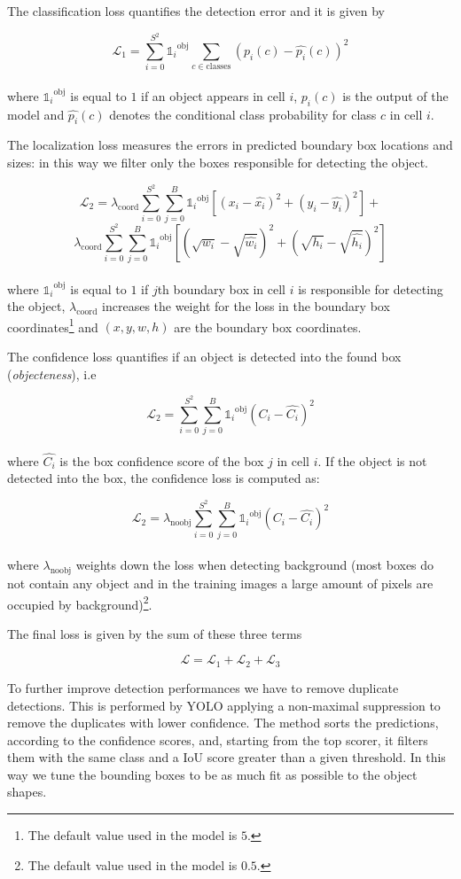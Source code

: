 \documentclass{standalone}
\begin{document}
The classification loss quantifies the detection error and it is given by

$$
\mathcal{L}_1 = \sum_{i=0}^{S^2} {\mathds{1}_i}^{\mbox{obj}} \sum_{c \in \mbox{classes}} \left(p_i(c) - \hat{p_i}(c)\right)^2
$$
\\where ${\mathds{1}_i}^{\mbox{obj}}$ is equal to $1$ if an object appears in cell $i$, $p_i(c)$ is the output of the model and $\hat{p_i}(c)$ denotes the conditional class probability for class $c$ in cell $i$.

The localization loss measures the errors in predicted boundary box locations and sizes: in this way we filter only the boxes responsible for detecting the object.

$$
\mathcal{L}_2 = \lambda_{\mbox{coord}} \sum_{i=0}^{S^2}\sum_{j=0}^B {\mathds{1}_i}^{\mbox{obj}} \left[ (x_i - \hat{x_i})^2 + (y_i - \hat{y_i})^2 \right] +
$$
$$
\lambda_{\mbox{coord}} \sum_{i=0}^{S^2}\sum_{j=0}^B {\mathds{1}_i}^{\mbox{obj}} \left[ (\sqrt{w_i} - \sqrt{\hat{w_i}})^2 + (\sqrt{h_i} - \sqrt{\hat{h_i}})^2 \right]
$$
\\
where ${\mathds{1}_i}^{\mbox{obj}}$ is equal to $1$ if $j$th boundary box in cell $i$ is responsible for detecting the object, $\lambda_{\mbox{coord}}$ increases the weight for the loss in the boundary box coordinates\footnote{
  The default value used in the model is $5$.
} and $(x, y, w, h)$ are the boundary box coordinates.

The confidence loss quantifies if an object is detected into the found box (\emph{objecteness}), i.e

$$
\mathcal{L}_2 = \sum_{i=0}^{S^2}\sum_{j=0}^B {\mathds{1}_i}^{\mbox{obj}} \left(C_i - \hat{C_i} \right)^2
$$
\\
where $\hat{C_i}$ is the box confidence score of the box $j$ in cell $i$.
If the object is not detected into the box, the confidence loss is computed as:

$$
\mathcal{L}_2 = \lambda_{\mbox{noobj}}\sum_{i=0}^{S^2}\sum_{j=0}^B {\mathds{1}_i}^{\mbox{obj}} \left(C_i - \hat{C_i} \right)^2
$$
\\
where $\lambda_{\mbox{noobj}}$ weights down the loss when detecting background (most boxes do not contain any object and in the training images a large amount of pixels are occupied by background)\footnote{
  The default value used in the model is $0.5$.
}.

The final loss is given by the sum of these three terms

$$
\mathcal{L} = \mathcal{L}_1 + \mathcal{L}_2 + \mathcal{L}_3
$$

To further improve detection performances we have to remove duplicate detections.
This is performed by YOLO applying a non-maximal suppression to remove the duplicates with lower confidence.
The method sorts the predictions, according to the confidence scores, and, starting from the top scorer, it filters them with the same class and a IoU score greater than a given threshold.
In this way we tune the bounding boxes to be as much fit as possible to the object shapes.
\end{document}
